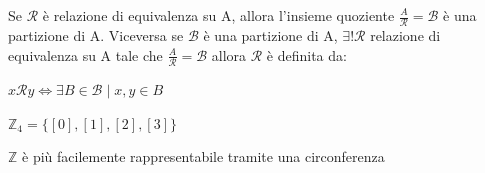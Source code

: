 \begin{boxA}
    Se $\mathcal{R}$ è relazione di equivalenza su A, allora l'insieme quoziente $\frac{A}{\mathcal{R}} = \mathcal{B}$ è una partizione di A. 
    Viceversa se $\mathcal{B}$ è una partizione di A, $\exists ! \mathcal{R}$ relazione di equivalenza su A tale che $\frac{A}{\mathcal{R}} = \mathcal{B}$ allora $\mathcal{R}$ è definita da:
    \begin{center}
        $x\mathcal{R}y \Leftrightarrow \exists B \in \mathcal{B} \; | \; x, y \in B$
    \end{center}
\end{boxA}

\begin{boxA}
    \begin{minipage}[t]{0.45\textwidth}
        \centering
        $\mathbb{Z}_4 = \{[0], [1], [2], [3]\}$
    \hfill
    \end{minipage}
    \begin{minipage}[t]{0.45\textwidth}
        \centering
    $\mathbb{Z}$ è più facilemente rappresentabile tramite una circonferenza
    \end{minipage}
\end{boxA}